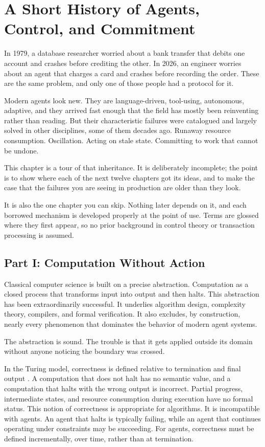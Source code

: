 \chapter{A Short History of Agents, Control, and Commitment}
\label{ch:history}

In 1979, a database researcher worried about a bank transfer that debits one
account and crashes before crediting the other. In 2026, an engineer worries about
an agent that charges a card and crashes before recording the order. These are the
same problem, and only one of those people had a protocol for it.

Modern agents look new. They are language-driven, tool-using, autonomous, adaptive,
and they arrived fast enough that the field has mostly been reinventing rather than
reading. But their characteristic failures were catalogued and largely solved in other
disciplines, some of them decades ago. Runaway resource consumption. Oscillation.
Acting on stale state. Committing to work that cannot be undone.

This chapter is a tour of that inheritance. It is deliberately incomplete; the
point is to show where each of the next twelve chapters got its ideas, and to make
the case that the failures you are seeing in production are older than they look.

It is also the one chapter you can skip. Nothing later depends on it, and each
borrowed mechanism is developed properly at the point of use. Terms are glossed
where they first appear, so no prior background in control theory or transaction
processing is assumed.
\section{Part I: Computation Without Action}

Classical computer science is built on a precise abstraction. Computation as a
closed process that transforms input into output and then halts. This abstraction
has been extraordinarily successful. It underlies algorithm design, complexity
theory, compilers, and formal verification. It also excludes, by construction,
nearly every phenomenon that dominates the behavior of modern agent systems.

The abstraction is sound. The trouble is that it gets applied outside its domain
without anyone noticing the boundary was crossed.

In the Turing model, correctness is defined relative to termination and final
output \cite{turing1936computable}. A computation that does not halt has no semantic
value, and a computation that halts with the wrong output is incorrect. Partial
progress, intermediate states, and resource consumption during execution have no
formal status. This notion of correctness is appropriate for algorithms. It is
incompatible with agents. An agent that halts is typically failing, while an agent
that continues operating under constraints may be succeeding. For agents,
correctness must be defined incrementally, over time, rather than at termination.

